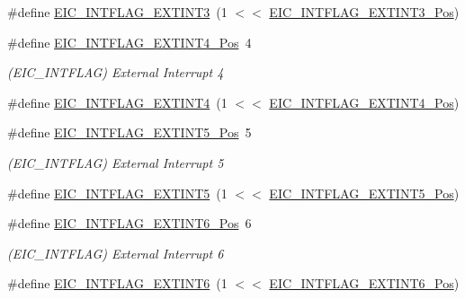 \begin{DoxyCompactItemize}
\#define \mbox{\hyperlink{group___s_a_m_d21___e_i_c_ga198d42f7974b7b441610de1c99257975}{E\+I\+C\+\_\+\+I\+N\+T\+F\+L\+A\+G\+\_\+\+E\+X\+T\+I\+N\+T3}}~(1 $<$$<$ \mbox{\hyperlink{group___s_a_m_d21___e_i_c_ga11e3d3fec097b0d415e60aab9931e738}{E\+I\+C\+\_\+\+I\+N\+T\+F\+L\+A\+G\+\_\+\+E\+X\+T\+I\+N\+T3\+\_\+\+Pos}})
\item 
\#define \mbox{\hyperlink{group___s_a_m_d21___e_i_c_ga64ee25399a90d6c2cec22480a218fed5}{E\+I\+C\+\_\+\+I\+N\+T\+F\+L\+A\+G\+\_\+\+E\+X\+T\+I\+N\+T4\+\_\+\+Pos}}~4
\begin{DoxyCompactList}\small\item\em (E\+I\+C\+\_\+\+I\+N\+T\+F\+L\+AG) External Interrupt 4 \end{DoxyCompactList}\item 
\#define \mbox{\hyperlink{group___s_a_m_d21___e_i_c_gaeea7dff3f5857191507b6916c0d8b219}{E\+I\+C\+\_\+\+I\+N\+T\+F\+L\+A\+G\+\_\+\+E\+X\+T\+I\+N\+T4}}~(1 $<$$<$ \mbox{\hyperlink{group___s_a_m_d21___e_i_c_ga64ee25399a90d6c2cec22480a218fed5}{E\+I\+C\+\_\+\+I\+N\+T\+F\+L\+A\+G\+\_\+\+E\+X\+T\+I\+N\+T4\+\_\+\+Pos}})
\item 
\#define \mbox{\hyperlink{group___s_a_m_d21___e_i_c_ga6a9bceb55e1b968caffb82f444ec2089}{E\+I\+C\+\_\+\+I\+N\+T\+F\+L\+A\+G\+\_\+\+E\+X\+T\+I\+N\+T5\+\_\+\+Pos}}~5
\begin{DoxyCompactList}\small\item\em (E\+I\+C\+\_\+\+I\+N\+T\+F\+L\+AG) External Interrupt 5 \end{DoxyCompactList}\item 
\#define \mbox{\hyperlink{group___s_a_m_d21___e_i_c_ga33a63f43338d663d61313b6caf8e037d}{E\+I\+C\+\_\+\+I\+N\+T\+F\+L\+A\+G\+\_\+\+E\+X\+T\+I\+N\+T5}}~(1 $<$$<$ \mbox{\hyperlink{group___s_a_m_d21___e_i_c_ga6a9bceb55e1b968caffb82f444ec2089}{E\+I\+C\+\_\+\+I\+N\+T\+F\+L\+A\+G\+\_\+\+E\+X\+T\+I\+N\+T5\+\_\+\+Pos}})
\item 
\#define \mbox{\hyperlink{group___s_a_m_d21___e_i_c_ga41706b9efd8e2d88dd7249e1755dd7f8}{E\+I\+C\+\_\+\+I\+N\+T\+F\+L\+A\+G\+\_\+\+E\+X\+T\+I\+N\+T6\+\_\+\+Pos}}~6
\begin{DoxyCompactList}\small\item\em (E\+I\+C\+\_\+\+I\+N\+T\+F\+L\+AG) External Interrupt 6 \end{DoxyCompactList}\item 
\#define \mbox{\hyperlink{group___s_a_m_d21___e_i_c_ga455717f643de18f05f18ed1db2e9be52}{E\+I\+C\+\_\+\+I\+N\+T\+F\+L\+A\+G\+\_\+\+E\+X\+T\+I\+N\+T6}}~(1 $<$$<$ \mbox{\hyperlink{group___s_a_m_d21___e_i_c_ga41706b9efd8e2d88dd7249e1755dd7f8}{E\+I\+C\+\_\+\+I\+N\+T\+F\+L\+A\+G\+\_\+\+E\+X\+T\+I\+N\+T6\+\_\+\+Pos}})

\end{DoxyCompactItemize}
